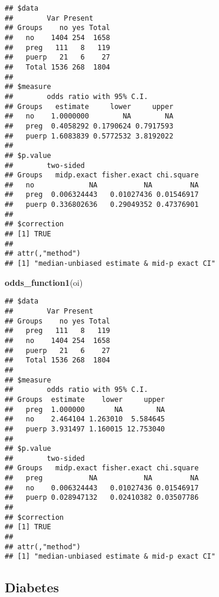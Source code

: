 \documentclass[
]{article}
\newenvironment{Shaded}{\begin{snugshade}}{\end{snugshade}}
\newcommand{\KeywordTok}[1]{\textcolor[rgb]{0.13,0.29,0.53}{\textbf{#1}}}
\newcommand{\NormalTok}[1]{#1}
\newcommand{\OperatorTok}[1]{\textcolor[rgb]{0.81,0.36,0.00}{\textbf{#1}}}
\newcommand{\StringTok}[1]{\textcolor[rgb]{0.31,0.60,0.02}{#1}}
\begin{document}
\begin{Shaded}
\end{Shaded}

\begin{verbatim}
## $data
##        Var Present
## Groups    no yes Total
##   no    1404 254  1658
##   preg   111   8   119
##   puerp   21   6    27
##   Total 1536 268  1804
## 
## $measure
##        odds ratio with 95% C.I.
## Groups   estimate     lower     upper
##   no    1.0000000        NA        NA
##   preg  0.4058292 0.1790624 0.7917593
##   puerp 1.6083839 0.5772532 3.8192022
## 
## $p.value
##        two-sided
## Groups   midp.exact fisher.exact chi.square
##   no             NA           NA         NA
##   preg  0.006324443   0.01027436 0.01546917
##   puerp 0.336802636   0.29049352 0.47376901
## 
## $correction
## [1] TRUE
## 
## attr(,"method")
## [1] "median-unbiased estimate & mid-p exact CI"
\end{verbatim}

\begin{Shaded}
\begin{Highlighting}[]
\KeywordTok{odds_function1}\NormalTok{(oi)}
\end{Highlighting}
\end{Shaded}

\begin{verbatim}
## $data
##        Var Present
## Groups    no yes Total
##   preg   111   8   119
##   no    1404 254  1658
##   puerp   21   6    27
##   Total 1536 268  1804
## 
## $measure
##        odds ratio with 95% C.I.
## Groups  estimate    lower     upper
##   preg  1.000000       NA        NA
##   no    2.464104 1.263010  5.584645
##   puerp 3.931497 1.160015 12.753040
## 
## $p.value
##        two-sided
## Groups   midp.exact fisher.exact chi.square
##   preg           NA           NA         NA
##   no    0.006324443   0.01027436 0.01546917
##   puerp 0.028947132   0.02410382 0.03507786
## 
## $correction
## [1] TRUE
## 
## attr(,"method")
## [1] "median-unbiased estimate & mid-p exact CI"
\end{verbatim}

\hypertarget{diabetes}{%
\subsection{Diabetes}\label{diabetes}}
\end{document}
